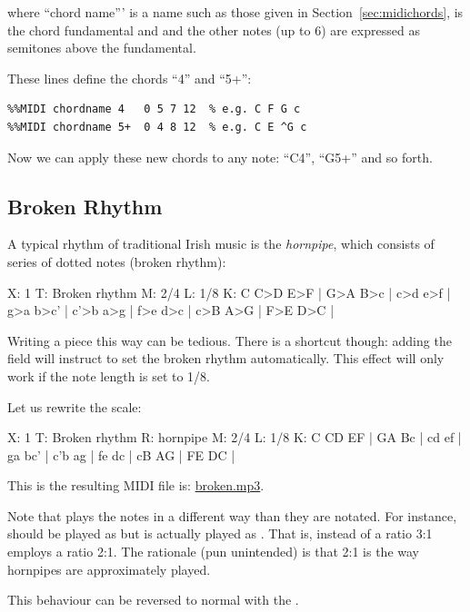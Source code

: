 \documentclass[a4paper,fullpage,12pt]{book}
\begin{document}
\medskip

where ``chord name''' is a name such as those given in
Section~\ref{sec:midichords},  is the chord fundamental and
and the other notes (up to 6) are expressed as semitones above the
fundamental.

These lines define the chords ``4'' and ``5+'':

\begin{verbatim}
%%MIDI chordname 4   0 5 7 12  % e.g. C F G c
%%MIDI chordname 5+  0 4 8 12  % e.g. C E ^G c
\end{verbatim}

Now we can apply these new chords to any note: ``C4'', ``G5+'' and so
forth.


\subsection{Broken Rhythm}
\label{sec:broken}

A typical rhythm of traditional Irish music is the \emph{hornpipe},
which consists of series of dotted notes (broken rhythm):

\begin{abcsource}
X: 1
T: Broken rhythm
M: 2/4
L: 1/8
K: C
C>D E>F  | G>A B>c | c>d e>f | g>a b>c' |
c'>b a>g | f>e d>c | c>B A>G | F>E D>C  |
\end{abcsource}

Writing a piece this way can be tedious. There is a shortcut though:
adding the  field will instruct \abcmid{} to set the
broken rhythm automatically. This effect will only work if the note
length is set to 1/8.

Let us rewrite the scale:

\begin{abcsource}
X: 1
T: Broken rhythm
R: hornpipe
M: 2/4
L: 1/8
K: C
CD EF  | GA Bc | cd ef | ga bc' |
c'b ag | fe dc | cB AG | FE DC  |
\end{abcsource}

This is the resulting MIDI file is: \href{run:broken.mp3}{broken.mp3}.

\begin{note}

  Note that \abcmid{} plays the notes in a different way than they are
  notated. For instance,  should be played as
   but is actually played as . That is,
  instead of a ratio 3:1 \abcmid{} employs a ratio 2:1. The rationale
  (pun unintended) is that 2:1 is the way hornpipes are approximately
  played.
  
  This behaviour can be reversed to normal with the .
  
\end{note}
\end{document}
